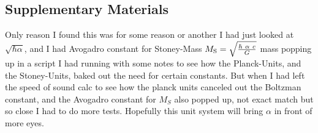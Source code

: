 \begin{multicols}{2}
%

\setcounter{table}{0}
\renewcommand{\thetable}{S\arabic{table}}%
\setcounter{figure}{0}
\renewcommand{\thefigure}{S\arabic{figure}}%
\subsection*{Supplementary Materials}
Only reason I found this was for some reason or another I had just looked at $\sqrt{\hbar \alpha}$, and I had Avogadro constant for Stoney-Mass $M_{{\text{S}}} = \sqrt{\hbar ~ \alpha ~c \over G}$ mass popping up in a script I had running with some notes to see how the Planck-Units, and the Stoney-Units\citep{Stoney1883}, baked out the need for certain constants. But when I had left the speed of sound calc to see how the planck units canceled out the Boltzman constant, and the Avogadro constant for $M_S$ also popped up, not exact match but so close I had to do more tests. Hopefully this unit system will bring $\alpha$ in front of more eyes.%

\end{multicols}

